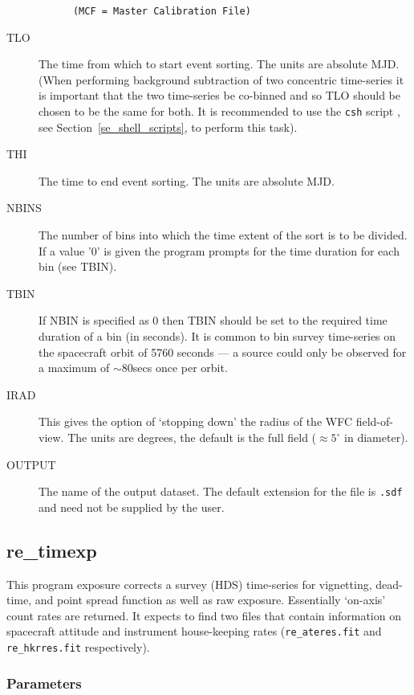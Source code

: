 \begin{description}
\begin{verbatim}
      (MCF = Master Calibration File)
\end{verbatim}

\item[TLO  ]
The time from which to start event sorting.   The units are absolute
MJD.  (When performing background subtraction of two concentric
time-series it is important that the two time-series be co-binned and
so TLO should be chosen to be the same for both. It is recommended to
use the {\tt csh} script , see
Section~\ref{se_shell_scripts}, to perform this task).
\item[THI ]
The time to end event sorting.   The units are absolute MJD.
\item[NBINS]
The number of bins into which the time extent of the sort
is to be divided. If a value '0' is given the program prompts for the
time duration for each bin (see TBIN).
\item[TBIN]
If NBIN is specified as 0 then TBIN should be set to the required
time duration of a bin (in seconds).  It is common to bin survey time-series on
the \ro spacecraft orbit of 5760 seconds --- a source could only be
observed for a maximum of $\sim 80$secs once per orbit.
\item[IRAD]
This gives the option of `stopping down' the radius of the WFC
field-of-view.  The units are degrees, the default is the full field
($\approx 5^{\circ}$ in diameter).
\item[OUTPUT]
The name of the output dataset. The default extension for the file is
{\tt .sdf } and need not be supplied by the user.
\end{description}

\subsection{\label{ss_re_timexp}re\_timexp}

This program exposure corrects a survey (HDS) time-series for
vignetting, dead-time, and point spread function as well as raw
exposure.  Essentially `on-axis' count rates are returned.   It expects
to find two files that contain information on spacecraft attitude and
instrument house-keeping rates ({\tt re\_ateres.fit} and {\tt
re\_hkrres.fit} respectively).

\subsubsection{Parameters}

